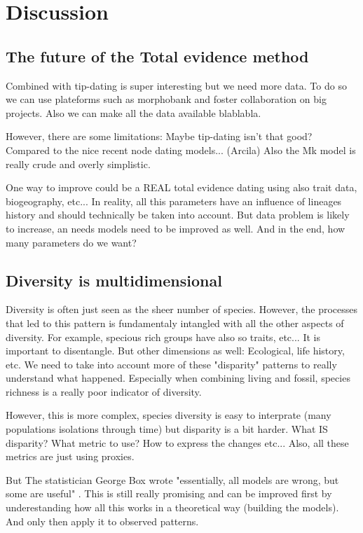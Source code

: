 \chapter{Discussion}
\label{chap:discussion}

%
% 

\section{The future of the Total evidence method}
Combined with tip-dating is super interesting but we need more data.
To do so we can use plateforms such as morphobank and foster collaboration on big projects.
Also we can make all the data available blablabla.

However, there are some limitations:
Maybe tip-dating isn't that good? Compared to the nice recent node dating models... (Arcila)
Also the Mk model is really crude and overly simplistic.

One way to improve could be a REAL total evidence dating using also trait data, biogeography, etc...
In reality, all this parameters have an influence of lineages history and should technically be taken into account.
But data problem is likely to increase, an needs models need to be improved as well.
And in the end, how many parameters do we want?

\section{Diversity is multidimensional}
Diversity is often just seen as the sheer number of species.
However, the processes that led to this pattern is fundamentaly intangled with all the other aspects of diversity.
For example, specious rich groups have also so traits, etc...
It is important to disentangle.
But other dimensions as well: Ecological, life history, etc.
We need to take into account more of these "disparity" patterns to really understand what happened.
Especially when combining living and fossil, species richness is a really poor indicator of diversity.

However, this is more complex, species diversity is easy to interprate (many populations isolations through time) but disparity is a bit harder.
What IS disparity? What metric to use? How to express the changes etc...
Also, all these metrics are just using proxies.

But  The statistician George Box wrote "essentially, all models are wrong, but some are useful" \citep{box1987empirical}. %
This is still really promising and can be improved first by underestanding how all this works in a theoretical way (building the models).
And only then apply it to observed patterns.

